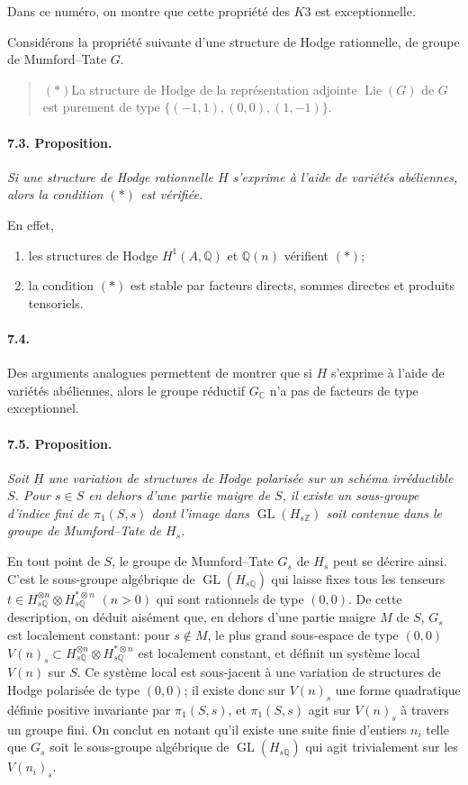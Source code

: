 \documentclass[10pt,leqno]{article}
\newcommand{\C}{\mathbb{C}}
\newcommand{\Q}{\mathbb{Q}}
\newcommand{\Z}{\mathbb{Z}}
\newcommand{\Lie}{\operatorname{Lie}}
\newcommand{\GL}{\operatorname{GL}}
\begin{document}
Dans ce numéro, on montre que cette propriété des $K3$ est exceptionnelle.

Considérons la propriété suivante d'une structure de Hodge rationnelle, de groupe de Mumford--Tate $G$.
\begin{quote}
\raggedright\noindent $(*)$\quad La structure de Hodge de la représentation adjointe $\Lie(G)$ de $G$ est purement de type $\{(-1,1),(0,0),(1,-1)\}$.
\end{quote}

\paragraph{7.3. Proposition.} \emph{Si une structure de Hodge rationnelle $H$ s'exprime à l'aide de variétés abéliennes, alors la condition $(*)$ est vérifiée.}

En effet,
\begin{enumerate}[label=(\alph*)]
\item les structures de Hodge $H^1(A,\Q)$ et $\Q(n)$ vérifient $(*)$;
\item la condition $(*)$ est stable par facteurs directs, sommes directes et produits tensoriels.
\end{enumerate}

\clearpage

\paragraph{7.4.} Des arguments analogues permettent de montrer que si $H$ s'exprime à l'aide de variétés abéliennes, alors le groupe réductif $G_\C$ n'a pas de \guillemotleft{}facteurs\guillemotright{} de type exceptionnel.

\paragraph{7.5. Proposition.} \emph{Soit $\underline H$ une variation de structures de Hodge polarisée sur un schéma irréductible $S$. Pour $s\in S$ en dehors d'une partie maigre de $S$, il existe un sous-groupe d'indice fini de $\pi_1(S,s)$ dont l'image dans $\GL(H_{s\Z})$ soit contenue dans le groupe de Mumford--Tate de $H_s$.}

En tout point de $S$, le groupe de Mumford--Tate $G_s$ de $H_s$ peut se décrire ainsi. C'est le sous-groupe algébrique de $\GL(H_{s\Q})$ qui laisse fixes tous les tenseurs $t\in H_{s\Q}^{\otimes n}\otimes H_{s\Q}^{*\otimes n}$ $(n>0)$ qui sont rationnels de type $(0,0)$. De cette description, on déduit aisément que, en dehors d'une partie maigre $M$ de $S$, $G_s$ est localement constant: pour $s\notin M$, le plus grand sous-espace de type $(0,0)$ $V(n)_s\subset H_{s\Q}^{\otimes n}\otimes H_{s\Q}^{*\otimes n}$ est localement constant, et définit un système local $V(n)$ sur $S$. Ce système local est sous-jacent à une variation de structures de Hodge polarisée de type $(0,0)$; il existe donc sur $V(n)_s$ une forme quadratique définie positive invariante par $\pi_1(S,s)$, et $\pi_1(S,s)$ agit sur $V(n)_s$ à travers un groupe fini. On conclut en notant qu'il existe une suite finie d'entiers $n_i$ telle que $G_s$ soit le sous-groupe algébrique de $\GL(H_{s\Q})$ qui agit trivialement sur les $V(n_i)_s$.
\end{document}
